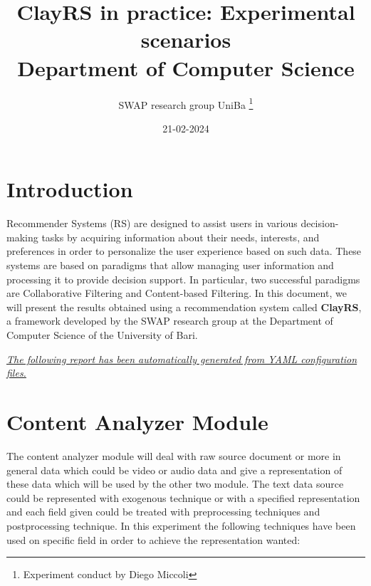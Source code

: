 \documentclass[11pt]{article}
\title{\textbf{ ClayRS in practice: Experimental scenarios }\\ [1cm] Department of Computer Science}
\author{ SWAP research group UniBa \thanks{Experiment conduct by Diego Miccoli}}
\date{21-02-2024}
\begin{document}
\maketitle

\section{Introduction}\label{sec:intro}
Recommender Systems (RS) are designed to assist users in various decision-making tasks by acquiring
information about their needs, interests, and preferences in order to personalize the user experience
based on such data.
These systems are based on paradigms that allow managing user information and processing
it to provide decision support.
In particular, two successful paradigms are Collaborative Filtering and Content-based Filtering.
In this document, we will present the results obtained using a recommendation system called \textbf{ClayRS},
a framework developed by the SWAP research group at the Department of Computer Science of the University of Bari.\\
\hfill\break

\textit{\ul{The following report has been automatically generated from YAML configuration files.}}

\hfill\break




\section{Content Analyzer Module}\label{sec:ca}
The content analyzer module will deal with raw source document or more in general data which could be
video or audio data and give a representation of these data which will be used by the other two module.
The text data source could be represented with exogenous technique or with a specified representation
and each field given could be treated with preprocessing techniques and postprocessing technique.
In this experiment the following techniques have been used on specific field in order to achieve the
representation wanted:
\hfill\break
\hfill\break
\end{document}
